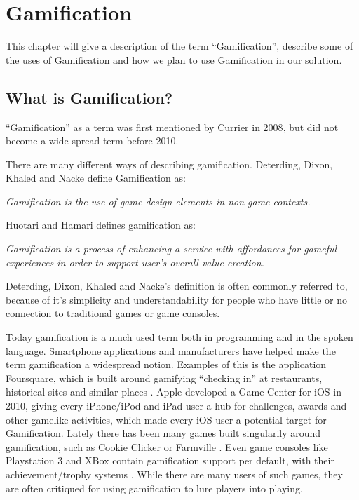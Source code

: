 \chapter{Gamification}
\label{chp:gamification}

This chapter will give a description of the term ``Gamification'', describe some of the uses of Gamification and how we plan to use Gamification in our solution.

\section{What is Gamification?}
\label{sec:whatisgamification}
``Gamification'' as a term was first mentioned by Currier in 2008\cite{gamificationcurrier}, but did not become a wide-spread term before 2010. 

There are many different ways of describing gamification. Deterding, Dixon, Khaled and Nacke\cite{Deterding:2011:GDE:2181037.2181040} define Gamification as:

\textit{Gamification is the use of game design elements in non-game
contexts.}

Huotari and Hamari\cite{huotari2012defining} defines gamification as:

\textit{Gamification is a process of enhancing a service with affordances for gameful experiences in order to support user's overall value creation.}

Deterding, Dixon, Khaled and Nacke's definition is often commonly referred to, because of it's simplicity and understandability for people who have little or no connection to traditional games or game consoles.

Today gamification is a much used term both in programming and in the spoken language. Smartphone applications and manufacturers have helped make the term gamification a widespread notion. Examples of this is the application Foursquare, which is built around gamifying ``checking in'' at restaurants, historical sites and similar places . Apple developed a Game Center for iOS in 2010, giving every iPhone/iPod and iPad user a hub for challenges, awards and other gamelike activities, which made every iOS user a potential target for Gamification. Lately there has been many games built singularily around gamification, such as Cookie Clicker  or Farmville . Even game consoles like Playstation 3 and XBox contain gamification support per default, with their achievement/trophy systems \cite{xbox, playstation}. While there are many users of such games, they are often critiqued for using gamification to lure players into playing. 


